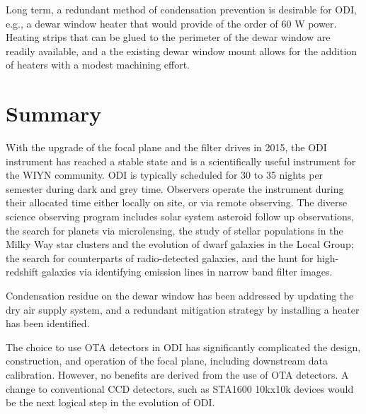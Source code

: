 \documentclass[]{spieman}
\begin{document}
Long term, a redundant method of condensation prevention is desirable for
ODI, e.g., a dewar window heater that would provide of the
order of 60 W power. Heating strips that can be glued to the perimeter of the
dewar window are readily available, and a the existing dewar window mount allows
for the addition of heaters with a modest machining effort.


\section{Summary}

With the upgrade of the focal plane and the filter drives in 2015, the ODI
instrument has reached a stable state and is a scientifically useful instrument
for the WIYN community. ODI is typically scheduled for 30 to 35 nights per
semester during dark and grey time. Observers operate the instrument during
their allocated time either locally on site, or via remote observing. The
diverse science observing program includes solar system asteroid follow up
observations, the search for planets via microlensing, the study of stellar
populations in the  Milky Way star clusters and the evolution of dwarf galaxies
in the Local Group; the search for  counterparts of radio-detected galaxies, and
the hunt for high-redshift galaxies via identifying emission lines in narrow
band filter images.

Condensation residue on the dewar window has been addressed by updating the
dry air supply system, and a redundant  mitigation strategy by installing
a heater has been identified.

The choice to use  OTA detectors in ODI has significantly complicated the
design, construction, and operation of the focal plane, including downstream
data calibration. However, no benefits are derived from the use of OTA
detectors.  A change to conventional CCD detectors, such as STA1600 10kx10k
devices would be the next logical step in the evolution of ODI.



 

\end{document}
